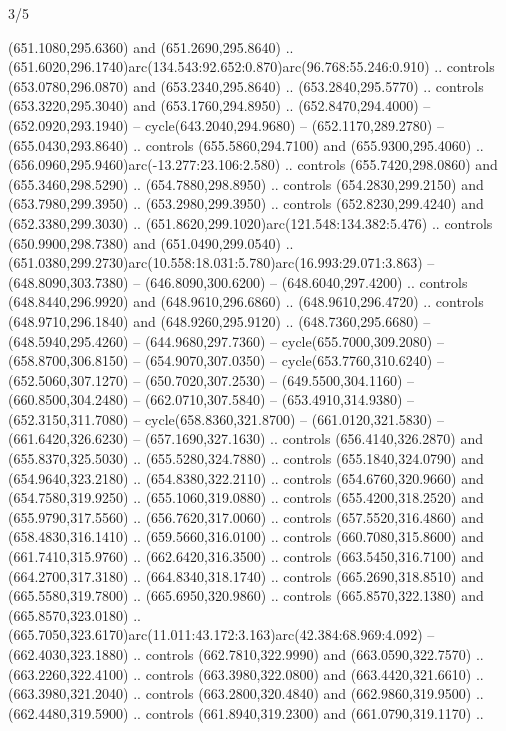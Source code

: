 \begin{flagdescription}{3/5}
\begin{scope}[xshift=0.5\flaglength,yshift=0.5\flagwidth,scale=\flagwidth/602.3]
\begin{scope}[y=0.8pt, x=0.8pt, yscale=-1, shift={(-600,-330)}]
  (651.1080,295.6360) and (651.2690,295.8640) ..
  (651.6020,296.1740)arc(134.543:92.652:0.870)arc(96.768:55.246:0.910) ..
  controls (653.0780,296.0870) and (653.2340,295.8640) .. (653.2840,295.5770) ..
  controls (653.3220,295.3040) and (653.1760,294.8950) .. (652.8470,294.4000) --
  (652.0920,293.1940) -- cycle(643.2040,294.9680) -- (652.1170,289.2780) --
  (655.0430,293.8640) .. controls (655.5860,294.7100) and (655.9300,295.4060) ..
  (656.0960,295.9460)arc(-13.277:23.106:2.580) .. controls (655.7420,298.0860)
  and (655.3460,298.5290) .. (654.7880,298.8950) .. controls (654.2830,299.2150)
  and (653.7980,299.3950) .. (653.2980,299.3950) .. controls (652.8230,299.4240)
  and (652.3380,299.3030) .. (651.8620,299.1020)arc(121.548:134.382:5.476) ..
  controls (650.9900,298.7380) and (651.0490,299.0540) ..
  (651.0380,299.2730)arc(10.558:18.031:5.780)arc(16.993:29.071:3.863) --
  (648.8090,303.7380) -- (646.8090,300.6200) -- (648.6040,297.4200) .. controls
  (648.8440,296.9920) and (648.9610,296.6860) .. (648.9610,296.4720) .. controls
  (648.9710,296.1840) and (648.9260,295.9120) .. (648.7360,295.6680) --
  (648.5940,295.4260) -- (644.9680,297.7360) -- cycle(655.7000,309.2080) --
  (658.8700,306.8150) -- (654.9070,307.0350) -- cycle(653.7760,310.6240) --
  (652.5060,307.1270) -- (650.7020,307.2530) -- (649.5500,304.1160) --
  (660.8500,304.2480) -- (662.0710,307.5840) -- (653.4910,314.9380) --
  (652.3150,311.7080) -- cycle(658.8360,321.8700) -- (661.0120,321.5830) --
  (661.6420,326.6230) -- (657.1690,327.1630) .. controls (656.4140,326.2870) and
  (655.8370,325.5030) .. (655.5280,324.7880) .. controls (655.1840,324.0790) and
  (654.9640,323.2180) .. (654.8380,322.2110) .. controls (654.6760,320.9660) and
  (654.7580,319.9250) .. (655.1060,319.0880) .. controls (655.4200,318.2520) and
  (655.9790,317.5560) .. (656.7620,317.0060) .. controls (657.5520,316.4860) and
  (658.4830,316.1410) .. (659.5660,316.0100) .. controls (660.7080,315.8600) and
  (661.7410,315.9760) .. (662.6420,316.3500) .. controls (663.5450,316.7100) and
  (664.2700,317.3180) .. (664.8340,318.1740) .. controls (665.2690,318.8510) and
  (665.5580,319.7800) .. (665.6950,320.9860) .. controls (665.8570,322.1380) and
  (665.8570,323.0180) ..
  (665.7050,323.6170)arc(11.011:43.172:3.163)arc(42.384:68.969:4.092) --
  (662.4030,323.1880) .. controls (662.7810,322.9990) and (663.0590,322.7570) ..
  (663.2260,322.4100) .. controls (663.3980,322.0800) and (663.4420,321.6610) ..
  (663.3980,321.2040) .. controls (663.2800,320.4840) and (662.9860,319.9500) ..
  (662.4480,319.5900) .. controls (661.8940,319.2300) and (661.0790,319.1170) ..

\end{scope}
\end{scope}
\end{flagdescription}
